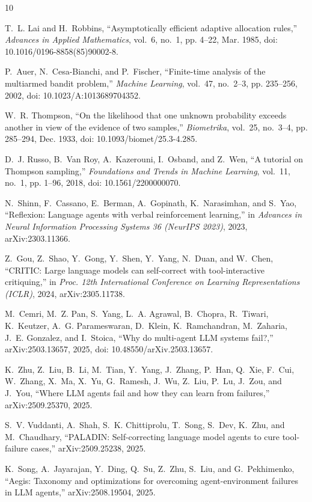 \documentclass[conference]{IEEEtran}
\begin{document}
\begin{thebibliography}{10}

T.~L. Lai and H.~Robbins, ``Asymptotically efficient adaptive allocation
rules,'' \emph{Advances in Applied Mathematics}, vol.~6, no.~1, pp.
4--22, Mar. 1985, doi: 10.1016/0196-8858(85)90002-8.

P.~Auer, N.~Cesa-Bianchi, and P.~Fischer, ``Finite-time analysis of the
multiarmed bandit problem,'' \emph{Machine Learning}, vol.~47, no.~2--3,
pp. 235--256, 2002, doi: 10.1023/A:1013689704352.

W.~R. Thompson, ``On the likelihood that one unknown probability exceeds
another in view of the evidence of two samples,'' \emph{Biometrika},
vol.~25, no.~3--4, pp. 285--294, Dec. 1933, doi: 10.1093/biomet/25.3-4.285.

D.~J. Russo, B.~Van Roy, A.~Kazerouni, I.~Osband, and Z.~Wen, ``A
tutorial on Thompson sampling,'' \emph{Foundations and Trends in Machine
Learning}, vol.~11, no.~1, pp. 1--96, 2018, doi: 10.1561/2200000070.

N.~Shinn, F.~Cassano, E.~Berman, A.~Gopinath, K.~Narasimhan, and S.~Yao,
``Reflexion: Language agents with verbal reinforcement learning,'' in
\emph{Advances in Neural Information Processing Systems 36 (NeurIPS
2023)}, 2023, arXiv:2303.11366.

Z.~Gou, Z.~Shao, Y.~Gong, Y.~Shen, Y.~Yang, N.~Duan, and W.~Chen,
``CRITIC: Large language models can self-correct with tool-interactive
critiquing,'' in \emph{Proc. 12th International Conference on Learning
Representations (ICLR)}, 2024, arXiv:2305.11738.

M.~Cemri, M.~Z. Pan, S.~Yang, L.~A. Agrawal, B.~Chopra, R.~Tiwari,
K.~Keutzer, A.~G. Parameswaran, D.~Klein, K.~Ramchandran, M.~Zaharia,
J.~E. Gonzalez, and I.~Stoica, ``Why do multi-agent LLM systems fail?,''
arXiv:2503.13657, 2025, doi: 10.48550/arXiv.2503.13657.

K.~Zhu, Z.~Liu, B.~Li, M.~Tian, Y.~Yang, J.~Zhang, P.~Han, Q.~Xie,
F.~Cui, W.~Zhang, X.~Ma, X.~Yu, G.~Ramesh, J.~Wu, Z.~Liu, P.~Lu, J.~Zou,
and J.~You, ``Where LLM agents fail and how they can learn from
failures,'' arXiv:2509.25370, 2025.

S.~V. Vuddanti, A.~Shah, S.~K. Chittiprolu, T.~Song, S.~Dev, K.~Zhu, and
M.~Chaudhary, ``PALADIN: Self-correcting language model agents to cure
tool-failure cases,'' arXiv:2509.25238, 2025.

K.~Song, A.~Jayarajan, Y.~Ding, Q.~Su, Z.~Zhu, S.~Liu, and G.~Pekhimenko,
``Aegis: Taxonomy and optimizations for overcoming agent-environment
failures in LLM agents,'' arXiv:2508.19504, 2025.

\end{thebibliography}
\end{document}
